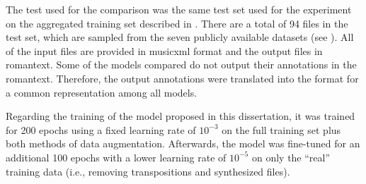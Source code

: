 
The test used for the comparison was the same test set used
for the experiment on the aggregated training set described
in . There are a
total of 94 files in the test set, which are sampled from
the seven publicly available datasets (see
). All of the input files
are provided in \gls{musicxml} format and the output files
in \gls{romantext}. Some of the models compared do not
output their annotations in the \gls{romantext}. Therefore,
the output annotations were translated into the format for a
common representation among all models.

Regarding the training of the model proposed in this
dissertation, it was trained for 200 epochs using a fixed
learning rate of $10^{-3}$ on the full training set plus
both methods of data augmentation. Afterwards, the model was
fine-tuned for an additional 100 epochs with a lower
learning rate of $10^{-5}$ on only the ``real'' training
data (i.e., removing transpositions and synthesized files).

